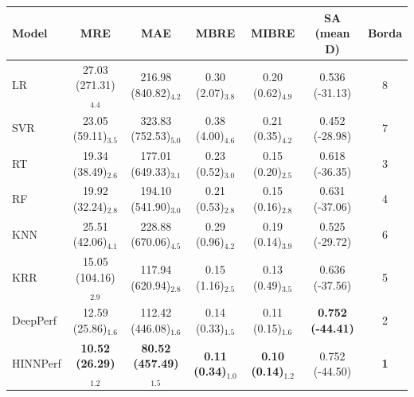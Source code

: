 \begin{tabular}{lcccccc}
\toprule
Model & MRE & MAE & MBRE & MIBRE & SA (mean D) & Borda \\
\midrule
LR & 27.03 (271.31)$_{4.4}$ & 216.98 (840.82)$_{4.2}$ & 0.30 (2.07)$_{3.8}$ & 0.20 (0.62)$_{4.9}$ & 0.536 (-31.13) & 8 \\
SVR & 23.05 (59.11)$_{3.5}$ & 323.83 (752.53)$_{5.0}$ & 0.38 (4.00)$_{4.6}$ & 0.21 (0.35)$_{4.2}$ & 0.452 (-28.98) & 7 \\
RT & 19.34 (38.49)$_{2.6}$ & 177.01 (649.33)$_{3.1}$ & 0.23 (0.52)$_{3.0}$ & 0.15 (0.20)$_{2.5}$ & 0.618 (-36.35) & 3 \\
RF & 19.92 (32.24)$_{2.8}$ & 194.10 (541.90)$_{3.0}$ & 0.21 (0.53)$_{2.8}$ & 0.15 (0.16)$_{2.8}$ & 0.631 (-37.06) & 4 \\
KNN & 25.51 (42.06)$_{4.1}$ & 228.88 (670.06)$_{4.5}$ & 0.29 (0.96)$_{4.2}$ & 0.19 (0.14)$_{3.9}$ & 0.525 (-29.72) & 6 \\
KRR & 15.05 (104.16)$_{2.9}$ & 117.94 (620.94)$_{2.8}$ & 0.15 (1.16)$_{2.5}$ & 0.13 (0.49)$_{3.5}$ & 0.636 (-37.56) & 5 \\
DeepPerf & 12.59 (25.86)$_{1.6}$ & 112.42 (446.08)$_{1.6}$ & 0.14 (0.33)$_{1.5}$ & 0.11 (0.15)$_{1.6}$ & \textbf{0.752 (-44.41)} & 2 \\
HINNPerf & \textbf{10.52 (26.29)$_{1.2}$} & \textbf{80.52 (457.49)$_{1.5}$} & \textbf{0.11 (0.34)$_{1.0}$} & \textbf{0.10 (0.14)$_{1.2}$} & 0.752 (-44.50) & \textbf{1} \\
\bottomrule
\end{tabular}
